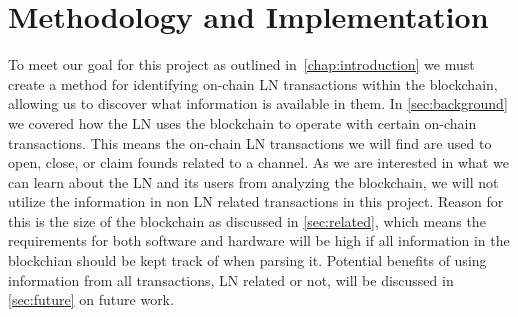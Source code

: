 \chapter{Methodology and Implementation}
\label{chap:metodology}

To meet our goal for this project as outlined in~\cref{chap:introduction} we must create a method for identifying on-chain LN transactions within the blockchain, allowing us to discover what information is available in them. In \cref{sec:background} we covered how the LN uses the blockchain to operate with certain on-chain transactions. This means the on-chain LN transactions we will find are used to open, close, or claim founds related to a channel. As we are interested in what we can learn about the LN and its users from analyzing the blockchain, we will not utilize the information in non LN related transactions in this project. Reason for this is the size of the blockchain as discussed in \cref{sec:related}, which means the requirements for both software and hardware will be high if all information in the blockchian should be kept track of when parsing it. Potential benefits of using information from all transactions, LN related or not, will be discussed in \cref{sec:future} on future work. 
\\

